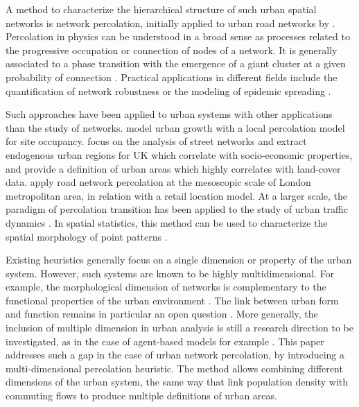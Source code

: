 \documentclass{jimis-en}
\begin{document}
A method to characterize the hierarchical structure of such urban spatial networks is network percolation, initially applied to urban road networks by \cite{arcaute2016cities}. Percolation in physics can be understood in a broad sense as processes related to the progressive occupation or connection of nodes of a network. It is generally associated to a phase transition with the emergence of a giant cluster at a given probability of connection \citep{stauffer2014introduction}. Practical applications in different fields include the quantification of network robustness \citep{callaway2000network} or the modeling of epidemic spreading \citep{newman1999scaling}.

Such approaches have been applied to urban systems with other applications than the study of networks. \cite{makse1998modeling} model urban growth with a local percolation model for site occupancy. \cite{arcaute2016cities} focus on the analysis of street networks and extract endogenous urban regions for UK which correlate with socio-economic properties, and provide a definition of urban areas which highly correlates with land-cover data. \cite{piovani2017urban} apply road network percolation at the mesoscopic scale of London metropolitan area, in relation with a retail location model. At a larger scale, the paradigm of percolation transition has been applied to the study of urban traffic dynamics \citep{Li669,Zeng23}. In spatial statistics, this method can be used to characterize the spatial morphology of point patterns \citep{huynh2018characterisation}.


Existing heuristics generally focus on a single dimension or property of the urban system. However, such systems are known to be highly multidimensional. For example, the morphological dimension of networks is complementary to the functional properties of the urban environment \citep{burger2012form}. The link between urban form and function remains in particular an open question \citep{batty1994fractal}. More generally, the inclusion of multiple dimension in urban analysis is still a research direction to be investigated, as in the case of agent-based models for example \citep{perez2016agent}. This paper addresses such a gap in the case of urban network percolation, by introducing a multi-dimensional percolation heuristic. The method allows combining different dimensions of the urban system, the same way that \cite{cottineau2018defining} link population density with commuting flows to produce multiple definitions of urban areas.
\end{document}
